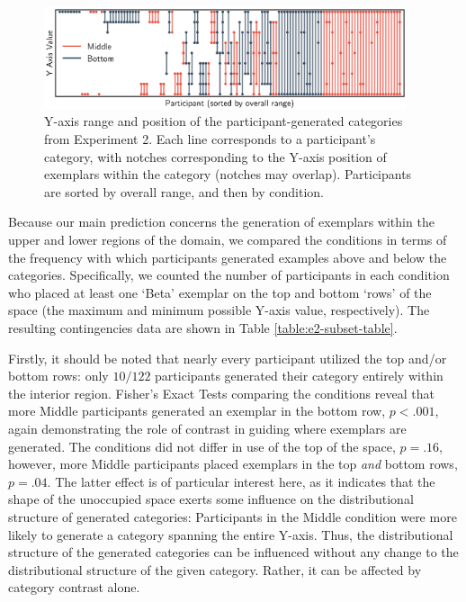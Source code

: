 \documentclass[pdflatex,sn-apa]{sn-jnl}%
\theoremstyle{thmstyleone}%
\theoremstyle{thmstyletwo}%
\theoremstyle{thmstylethree}%
\begin{document}
\begin{figure}
    \begin{center} \includegraphics[width=0.95\textwidth]{figs/e2-yranges.eps}
    \caption{Y-axis range and position of the participant-generated categories
from Experiment 2. Each line corresponds to a participant's category, with
notches corresponding to the Y-axis position of exemplars within the category
(notches may overlap). Participants are sorted by overall range, and then by
condition. }
    \label{fig:e2-yranges}
    \end{center}
\end{figure}

Because our main prediction concerns the generation of exemplars within the
upper and lower regions of the domain, we compared the conditions in terms of
the frequency with which participants generated examples above and below the
categories. Specifically, we counted the number of participants in each
condition who placed at least one `Beta' exemplar on the top and bottom `rows'
of the space (the maximum and minimum possible Y-axis value, respectively). The
resulting contingencies data are shown in Table \ref{table:e2-subset-table}.

Firstly, it should be noted that nearly every participant utilized the top
and/or bottom rows: only $10 / 122$ participants generated their category
entirely within the interior region. Fisher's Exact Tests comparing the
conditions reveal that more Middle participants generated an exemplar in the
bottom row, $p < .001$, again demonstrating the role of contrast in guiding
where exemplars are generated. The conditions did not differ in use of the top
of the space, $p = .16$, however, more Middle participants placed exemplars in
the top {\em and} bottom rows, $p = .04$. The latter effect is of particular interest
here, as it indicates that the shape of the unoccupied space exerts some
influence on the distributional structure of generated categories: Participants
in the Middle condition were more likely to generate a category spanning the
entire Y-axis. Thus, the distributional structure of the generated categories
can be influenced without any change to the distributional structure of the
given category. Rather, it can be affected by category contrast alone.
\end{document}
